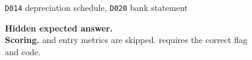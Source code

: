 \begin{figure}[t]
{\begin{minipage}{\dimexpr0.965\textwidth-2\fboxsep-2\fboxrule\relax}
\begin{minipage}[t]{0.335\linewidth}
\texttt{D014} depreciation schedule, \texttt{D020} bank statement
\end{minipage}\hfill
\begin{minipage}[t]{0.29\linewidth}
\textbf{Hidden expected answer.}\\
\vspace{2pt}
\textbf{Scoring.} \bsexact{} and entry metrics are skipped. \incCode{} requires the correct flag and code.
\end{minipage}


\end{minipage}}
\end{figure}
